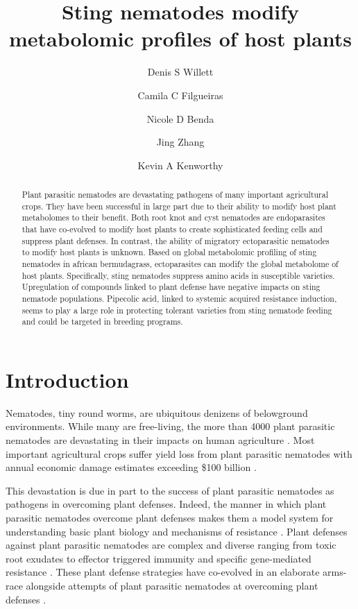 \documentclass[9pt,lineno]{elife}
\title{Sting nematodes modify metabolomic profiles of host plants}
\author[1*,\authfn{1}]{Denis S Willett}
\author[1,\authfn{1}]{Camila C Filgueiras}
\author[2]{Nicole D Benda}
\author[2]{Jing Zhang}
\author[3]{Kevin A Kenworthy}
\affil[1]{Applied Chemical Ecology Technology, Department of Entomology, Cornell AgriTech}
\affil[2]{Entomology and Nemotalogy Department, University of Florida}
\affil[3]{Agronomy Department, University of Florida}
\begin{document}
\maketitle

\begin{abstract}
Plant parasitic nematodes are devastating pathogens of many important agricultural crops.  They have been successful in large part due to their ability to modify host plant metabolomes to their benefit.  Both root knot and cyst nematodes are endoparasites that have co-evolved to modify host plants to create sophisticated feeding cells and suppress plant defenses. In contrast, the ability of migratory ectoparasitic nematodes to modify host plants is unknown.  Based on global metabolomic profiling of sting nematodes in african bermudagrass, ectoparasites can modify the global metabolome of host plants.  Specifically, sting nematodes suppress amino acids in susceptible varieties.  Upregulation of compounds linked to plant defense have negative impacts on sting nematode populations.  Pipecolic acid, linked to systemic acquired resistance induction, seems to play a large role in protecting tolerant varieties from sting nematode feeding and could be targeted in breeding programs.  
\end{abstract}


\section{Introduction}

Nematodes, tiny round worms, are ubiquitous denizens of belowground environments.  While many are free-living, the more than 4000 plant parasitic nematodes are devastating in their impacts on human agriculture \citep{jones2013top,moens}. Most important agricultural crops suffer yield loss from plant parasitic nematodes with annual economic damage estimates exceeding \$100 billion \citep{jones2013top, williamson2006nematode}.  

This devastation is due in part to the success of plant parasitic nematodes as pathogens in overcoming plant defenses.  Indeed, the manner in which plant parasitic nematodes overcome plant defenses makes them a model system for understanding basic plant biology and mechanisms of resistance \citep{opperman1998soybean,williamson2006nematode}.  Plant defenses against plant parasitic nematodes are complex and diverse ranging from toxic root exudates to effector triggered immunity and specific gene-mediated resistance \citep{yeates1987plants, williamson2006nematode}.  These plant defense strategies have co-evolved in an elaborate arms-race alongside attempts of plant parasitic nematodes at overcoming plant defenses \citep{stone1985co,williamson2006nematode,zacheo1995plant}.  
\end{document}
